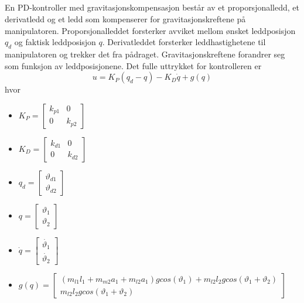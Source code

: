 \documentclass[norsk]{article}
\begin{document}
\subsection{ }
En PD-kontroller med gravitasjonskompensasjon består av et proporsjonalledd, et derivatledd og et ledd som kompenserer for gravitasjonskreftene på manipulatoren. Proporsjonalleddet forsterker avviket mellom ønsket leddposisjon \(q_d\) og faktisk leddposisjon \(q\). Derivatleddet forsterker leddhastighetene til manipulatoren og trekker det fra pådraget. Gravitasjonskreftene forandrer seg som funksjon av leddposisjonene. Det fulle uttrykket for kontrolleren er 
\[u = K_P(q_d - q) - K_D\dot{q} + g(q)\]
hvor \begin{itemize}

\item \(K_P = \begin{bmatrix}
k_{p1} & 0 \\
0 & k_{p2}
\end{bmatrix}\)
\item \(K_D = \begin{bmatrix}
k_{d1} & 0 \\
0 & k_{d2}
\end{bmatrix}\)
\item \(q_d = \begin{bmatrix}
\vartheta_{d1} \\ \vartheta_{d2}
\end{bmatrix}\)
\item \(q = \begin{bmatrix}
\vartheta_1 \\ \vartheta_2
\end{bmatrix}\)
\item \(\dot{q} = \begin{bmatrix}
\dot{\vartheta_1} \\ \dot{\vartheta_2}
\end{bmatrix}\)
\item \(g(q) = \begin{bmatrix}
(m_{l1}l_1+m_{m2}a_1+m_{l2}a_1)gcos(\vartheta_1) + m_{l2}l_2gcos(\vartheta_1 + \vartheta_2) \\ m_{l2}l_2gcos(\vartheta_1 + \vartheta_2)
\end{bmatrix}\)


\end{itemize}
\end{document}
